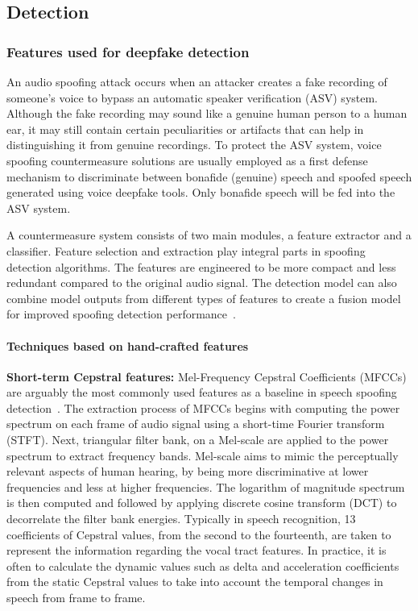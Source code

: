 \hspace{2mm}
\subsection{Detection}\label{sec:voice_detection}
\subsubsection{Features used for deepfake detection} %


An audio spoofing attack occurs when an attacker creates a fake recording of someone's voice to bypass an automatic speaker verification (ASV) system. Although the fake recording may sound like a genuine human person to a human ear, it may still contain certain peculiarities or artifacts that can help in distinguishing it from genuine recordings. To protect the ASV system, voice spoofing countermeasure solutions are usually employed as a first defense mechanism to discriminate between bonafide (genuine) speech and spoofed speech generated using voice deepfake tools. Only bonafide speech will be fed into the ASV system.

A countermeasure system consists of two main modules, a feature extractor and a classifier. Feature selection and extraction play integral parts in spoofing detection algorithms. The features are engineered to be more compact and less redundant compared to the original audio signal. The detection model can also combine model outputs from different types of features to create a fusion model for improved spoofing detection performance~\cite{balamurali2019}.

\paragraph{Techniques based on hand-crafted features}

\textbf{Short-term Cepstral features:}
Mel-Frequency Cepstral Coefficients (MFCCs)~\cite{mfcc} are arguably the most commonly used features as a baseline in speech spoofing detection~\cite{sahidullah2015}. The extraction process of MFCCs begins with computing the power spectrum on each frame of audio signal using a short-time Fourier transform (STFT). Next, triangular filter bank, on a Mel-scale are applied to the power spectrum to extract frequency bands. Mel-scale aims to mimic the perceptually relevant aspects of human hearing, by being more discriminative at lower frequencies and less at higher frequencies. The logarithm of magnitude spectrum is then computed and followed by applying discrete cosine transform (DCT) to decorrelate the filter bank energies. Typically in speech recognition, 13 coefficients of Cepstral values, from the second to the fourteenth, are taken to represent the information regarding the vocal tract features. In practice, it is often to calculate the dynamic values such as delta and acceleration coefficients from the static Cepstral values to take into account the temporal changes in speech from frame to frame.

